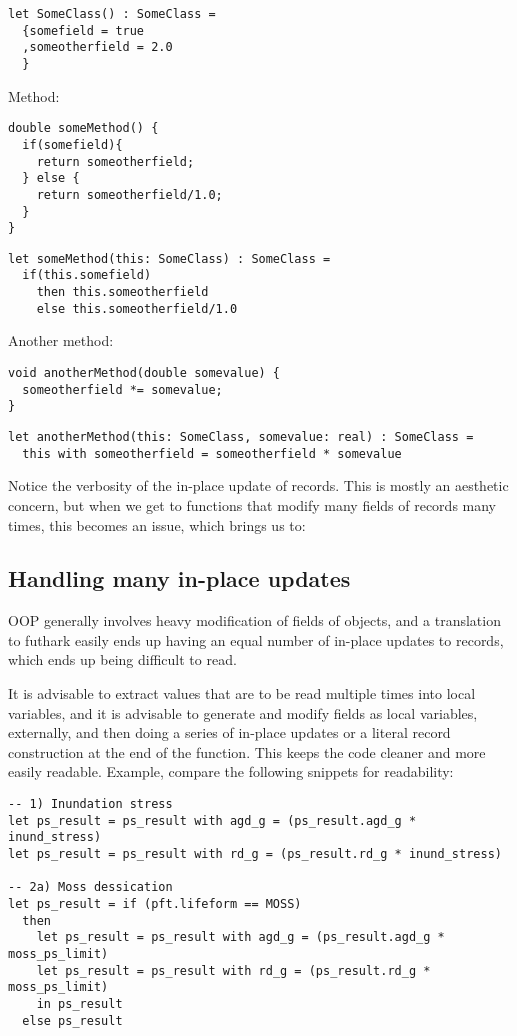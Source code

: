 \begin{verbatim}
let SomeClass() : SomeClass =
  {somefield = true
  ,someotherfield = 2.0
  }
\end{verbatim}









Method:
\begin{verbatim}
double someMethod() {
  if(somefield){
    return someotherfield;
  } else {
    return someotherfield/1.0;
  }
}
\end{verbatim}
\begin{verbatim}
let someMethod(this: SomeClass) : SomeClass =
  if(this.somefield)
    then this.someotherfield
    else this.someotherfield/1.0
\end{verbatim}



Another method:
\begin{verbatim}
void anotherMethod(double somevalue) {
  someotherfield *= somevalue;
}
\end{verbatim}
\begin{verbatim}
let anotherMethod(this: SomeClass, somevalue: real) : SomeClass =
  this with someotherfield = someotherfield * somevalue
\end{verbatim}

Notice the verbosity of the in-place update of records. This is mostly an aesthetic concern, but when we get to functions that modify many fields of records many times, this becomes an issue, which brings us to:

\subsection{Handling many in-place updates}

OOP generally involves heavy modification of fields of objects, and a translation to futhark easily ends up having an equal number of in-place updates to records, which ends up being difficult to read.

It is advisable to extract values that are to be read multiple times into local variables, and it is advisable to generate and modify fields as local variables, externally, and then doing a series of in-place updates or a literal record construction at the end of the function. This keeps the code cleaner and more easily readable. Example, compare the following snippets for readability:
\newpage
\begin{verbatim}
-- 1) Inundation stress
let ps_result = ps_result with agd_g = (ps_result.agd_g * inund_stress)
let ps_result = ps_result with rd_g = (ps_result.rd_g * inund_stress)

-- 2a) Moss dessication
let ps_result = if (pft.lifeform == MOSS)
  then
    let ps_result = ps_result with agd_g = (ps_result.agd_g * moss_ps_limit)
    let ps_result = ps_result with rd_g = (ps_result.rd_g * moss_ps_limit)
    in ps_result
  else ps_result
\end{verbatim}

